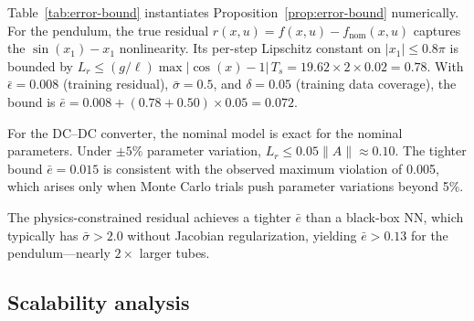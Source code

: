 \documentclass[12pt,a4paper]{article}
\begin{document}
Table~\ref{tab:error-bound} instantiates
Proposition~\ref{prop:error-bound} numerically. For the pendulum, the
true residual $r(x,u) = f(x,u) - f_{\mathrm{nom}}(x,u)$ captures the
$\sin(x_1) - x_1$ nonlinearity. Its per-step Lipschitz constant on
$|x_1| \leq 0.8\pi$ is bounded by
$L_r \leq (g/\ell)\max|\cos(x)-1|\,T_s = 19.62 \times 2 \times 0.02
= 0.78$. With $\bar\epsilon = 0.008$ (training residual),
$\bar\sigma = 0.5$, and $\delta = 0.05$ (training data coverage),
the bound is $\bar{e} = 0.008 + (0.78 + 0.50) \times 0.05 = 0.072$.

For the DC--DC converter, the nominal model is exact for the nominal
parameters. Under $\pm 5\%$ parameter variation, $L_r \leq 0.05\|A\|
\approx 0.10$. The tighter bound $\bar{e} = 0.015$ is consistent
with the observed maximum violation of 0.005, which arises only when
Monte Carlo trials push parameter variations beyond 5\%.

The physics-constrained residual achieves a tighter $\bar{e}$ than a
black-box NN, which typically has $\bar\sigma > 2.0$ without Jacobian
regularization, yielding $\bar{e} > 0.13$ for the pendulum---nearly
$2\times$ larger tubes.

\subsection{Scalability analysis}
\label{subsec:scalability}
\end{document}
